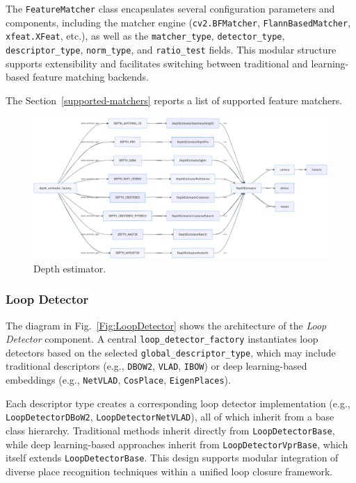 \documentclass{article}
\begin{document}
The \texttt{FeatureMatcher} class encapsulates several configuration parameters and components, including the matcher engine (\texttt{cv2.BFMatcher}, \texttt{FlannBasedMatcher}, \texttt{xfeat.XFeat}, etc.), as well as the \texttt{matcher\_type}, \texttt{detector\_type}, \texttt{descriptor\_type}, \texttt{norm\_type}, and \texttt{ratio\_test} fields. This modular structure supports extensibility and facilitates switching between traditional and learning-based feature matching backends.

The Section~\ref{supported-matchers} reports a list of supported feature matchers. 


\begin{figure}[!t]
\begin{center}
    \includegraphics[width=\textwidth]{./images/depth_estimator.png}
\end{center}
\caption{Depth estimator.}
\label{Fig:DepthEstimator}
\end{figure}


\subsubsection{Loop Detector}

The diagram in Fig.~\ref{Fig:LoopDetector} shows the architecture of the \textit{Loop Detector} component. A central \texttt{loop\_detector\_factory} instantiates loop detectors based on the selected \texttt{global\_descriptor\_type}, which may include traditional descriptors (e.g., \texttt{DBOW2}, \texttt{VLAD}, \texttt{IBOW}) or deep learning-based embeddings (e.g., \texttt{NetVLAD}, \texttt{CosPlace}, \texttt{EigenPlaces}).

Each descriptor type creates a corresponding loop detector implementation (e.g., \texttt{LoopDetectorDBoW2}, \texttt{LoopDetectorNetVLAD}), all of which inherit from a base class hierarchy. Traditional methods inherit directly from \texttt{LoopDetectorBase}, while deep learning-based approaches inherit from \texttt{LoopDetectorVprBase}, which itself extends \texttt{LoopDetectorBase}. This design supports modular integration of diverse place recognition techniques within a unified loop closure framework.
\end{document}
